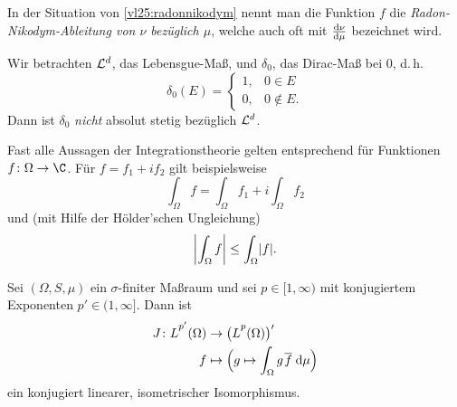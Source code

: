 \nnBemerkung 
In der Situation von \cref{vl25:radonnikodym} nennt man die Funktion $f$ die
\emph{Radon-Nikodym-Ableitung von $\nu$ bezüglich $\mu$}, welche auch oft mit
$\frac{\mathrm d\nu}{\mathrm d\mu}$ bezeichnet wird.

\nnBeispiel Wir betrachten $\mathcal{L}^d$, das Lebensgue-Maß, und $\delta_0$, das
Dirac-Maß bei $0$, d.\,h.  \[ \delta_0(E) = \begin{cases}
1, & 0\in E \\ 0, & 0\notin E . \end{cases} \]
Dann ist $\delta_0$ \emph{nicht} absolut stetig bezüglich
$\mathcal{L}^d$.

\nnBemerkung Fast alle Aussagen der Integrationstheorie gelten entsprechend für
Funktionen $f\colon\Omega\to\C$. Für $f = f_1 + if_2$ gilt beispielsweise
\[ \int_\Omega f = \int_\Omega f_1 + i \int_\Omega f_2 \]
und (mit Hilfe der Hölder'schen Ungleichung)
\[ \abs*{\int_\Omega f} \leq \int_\Omega \abs{f}  . \]

\begin{thSatz}
    Sei $(\Omega,S,\mu)$ ein $\sigma$-finiter Maßraum und sei $p\in[1,\infty)$
    mit konjugiertem Exponenten $p'\in(1,\infty]$. Dann ist
    \begin{align*}
        J\colon \Lpp[p'](\Omega) &\to \bigl( \Lpp(\Omega) \bigr)'
        \\
        f &\mapsto \Bigl( 
                g \mapsto \int_\Omega g\mkern2mu\ol{f} \dif\mu
            \Bigr)
    \end{align*}
    ein konjugiert linearer, isometrischer Isomorphismus.
\end{thSatz}

